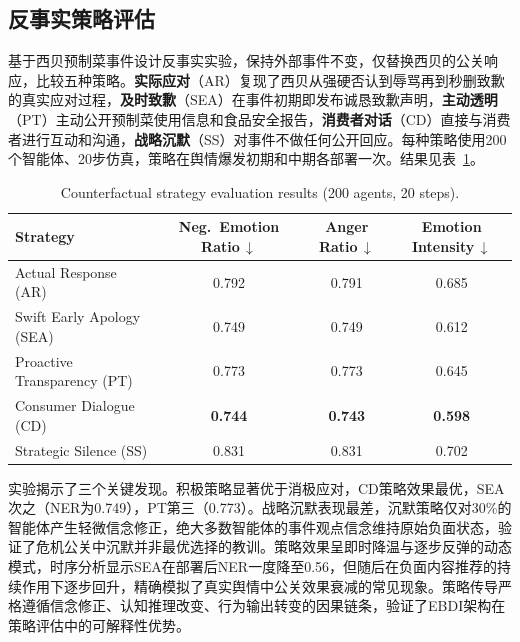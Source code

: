 \documentclass[a4paper,fleqn]{cas-sc}
\newcommand{\best}[1]{\textbf{#1}}
\begin{document}
\subsection{反事实策略评估}

基于西贝预制菜事件设计反事实实验，保持外部事件不变，仅替换西贝的公关响应，比较五种策略。\textbf{实际应对}（AR）复现了西贝从强硬否认到辱骂再到秒删致歉的真实应对过程，\textbf{及时致歉}（SEA）在事件初期即发布诚恳致歉声明，\textbf{主动透明}（PT）主动公开预制菜使用信息和食品安全报告，\textbf{消费者对话}（CD）直接与消费者进行互动和沟通，\textbf{战略沉默}（SS）对事件不做任何公开回应。每种策略使用200个智能体、20步仿真，策略在舆情爆发初期和中期各部署一次。结果见表~\ref{tab:counter}。

\begin{table}[!t]
\centering
\caption{Counterfactual strategy evaluation results (200 agents, 20 steps).}
\label{tab:counter}
\small
\renewcommand{\arraystretch}{1.05}
\begin{tabular}{@{}lccc@{}}
\toprule
\textbf{Strategy} & \makecell{\textbf{Neg.\ Emotion}\\\textbf{Ratio}\,$\downarrow$} & \makecell{\textbf{Anger}\\\textbf{Ratio}\,$\downarrow$} & \makecell{\textbf{Emotion}\\\textbf{Intensity}\,$\downarrow$} \\
\midrule
Actual Response (AR) & 0.792 & 0.791 & 0.685 \\
Swift Early Apology (SEA) & 0.749 & 0.749 & 0.612 \\
Proactive Transparency (PT) & 0.773 & 0.773 & 0.645 \\
\rowcolor{grayrow}
Consumer Dialogue (CD) & \best{0.744} & \best{0.743} & \best{0.598} \\
Strategic Silence (SS) & 0.831 & 0.831 & 0.702 \\
\bottomrule
\end{tabular}
\end{table}

实验揭示了三个关键发现。积极策略显著优于消极应对，CD策略效果最优，SEA次之（NER为0.749），PT第三（0.773）。战略沉默表现最差，沉默策略仅对30\%的智能体产生轻微信念修正，绝大多数智能体的事件观点信念维持原始负面状态，验证了危机公关中沉默并非最优选择的教训。策略效果呈即时降温与逐步反弹的动态模式，时序分析显示SEA在部署后NER一度降至0.56，但随后在负面内容推荐的持续作用下逐步回升，精确模拟了真实舆情中公关效果衰减的常见现象。策略传导严格遵循信念修正、认知推理改变、行为输出转变的因果链条，验证了EBDI架构在策略评估中的可解释性优势。
\end{document}

